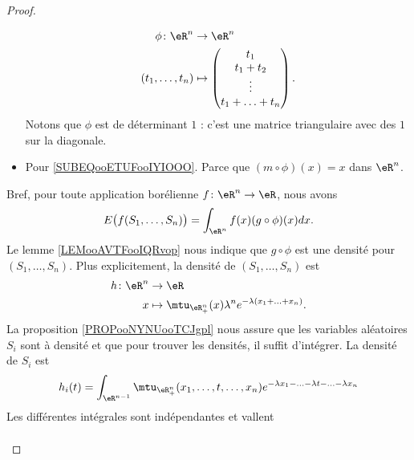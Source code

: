 \begin{proof}
\begin{subproof}
\begin{itemize}
\begin{equation}
\begin{aligned}
                    \phi\colon \eR^n&\to \eR^n \\
                    (t_1,\ldots, t_n)&\mapsto \begin{pmatrix}
                        t_1    \\ 
                        t_1+t_2    \\ 
                        \vdots    \\ 
                        t_1+\ldots +t_n    
                    \end{pmatrix}.
                \end{aligned}
            \end{equation}
            Notons que \( \phi\) est de déterminant \( 1\) : c'est une matrice triangulaire avec des \( 1\) sur la diagonale.
        \item Pour \eqref{SUBEQooETUFooIYIOOO}. Parce que \( (m\circ \phi)(x)=x\) dans \( \eR^n\).
    \end{itemize}
    Bref, pour toute application borélienne \( f\colon \eR^n\to \eR\), nous avons
    \begin{equation}
        E\big( f(S_1,\ldots, S_n) \big)=\int_{\eR^n}f(x)(g\circ \phi)(x)dx.
    \end{equation}
    Le lemme \ref{LEMooAVTFooIQRvop} nous indique que \( g\circ \phi\) est une densité pour \( (S_1,\ldots, S_n)\). Plus explicitement, la densité de \( (S_1,\ldots, S_n)\) est
    \begin{equation}
        \begin{aligned}
            h\colon \eR^n&\to \eR \\
            x&\mapsto \mtu_{\eR^n_+}(x)\lambda^n e^{-\lambda(x_1+\ldots +x_n)}. 
        \end{aligned}
    \end{equation}
    La proposition \ref{PROPooNYNUooTCJgpl} nous assure que les variables aléatoires \( S_i\) sont à densité et que pour trouver les densités, il suffit d'intégrer. La densité de \( S_i\) est
    \begin{equation}
        h_i(t)=\int_{\eR^{n-1}}\mtu_{\eR^n_+}(x_1,\ldots, t,\ldots, x_n) e^{-\lambda x_1-\ldots -\lambda t-\ldots -\lambda x_n}
    \end{equation}
    Les différentes intégrales sont indépendantes et vallent
    \begin{subequations}
        \begin{align}

\end{align}
\end{subequations}
\end{subproof}
\end{proof}
